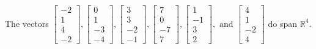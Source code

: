 \begin{exercise}
\begin{exerciseStatement}
  \end{exerciseStatement}
  \begin{exerciseAnswer}
   The vectors \(\left[\begin{array}{r}
-2 \\
1 \\
4 \\
-2
\end{array}\right] , \left[\begin{array}{r}
0 \\
1 \\
-3 \\
-4
\end{array}\right] , \left[\begin{array}{r}
3 \\
3 \\
-2 \\
-1
\end{array}\right] , \left[\begin{array}{r}
7 \\
0 \\
-7 \\
7
\end{array}\right] , \left[\begin{array}{r}
1 \\
-1 \\
3 \\
2
\end{array}\right] , \text{ and } \left[\begin{array}{r}
4 \\
1 \\
-2 \\
4
\end{array}\right]\) 
  	 do  
	span \(\mathbb{R}^4\).
  


  \end{exerciseAnswer}
\end{exercise}